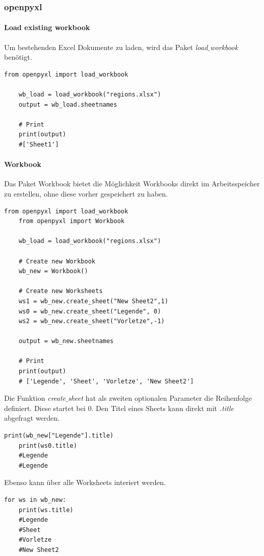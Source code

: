 \subsubsection{openpyxl}

\paragraph{Load existing workbook}
Um bestehenden Excel Dokumente zu laden, wird das Paket \textit{load}$\_$\textit{workbook} benötigt.
\begin{lstlisting}[style=python]
	from openpyxl import load_workbook
	
	wb_load = load_workbook("regions.xlsx")
	output = wb_load.sheetnames
	
	# Print
	print(output)
	#['Sheet1']
\end{lstlisting}

\paragraph{Workbook}
Das Paket Workbook bietet die Möglichkeit Workbooks direkt im Arbeitsspeicher zu erstellen, ohne diese vorher gespeichert zu haben.
\begin{lstlisting}[style=python]
	from openpyxl import load_workbook
	from openpyxl import Workbook
	
	wb_load = load_workbook("regions.xlsx")
	
	# Create new Workbook
	wb_new = Workbook()
	
	# Create new Worksheets
	ws1 = wb_new.create_sheet("New Sheet2",1)
	ws0 = wb_new.create_sheet("Legende", 0)
	ws2 = wb_new.create_sheet("Vorletze",-1)
	
	output = wb_new.sheetnames
	
	# Print
	print(output)
	# ['Legende', 'Sheet', 'Vorletze', 'New Sheet2']
\end{lstlisting}
Die Funktion \textit{create}$\_$\textit{sheet} hat als zweiten optionalen Parameter die Reihenfolge definiert. Diese startet bei 0.
Den Titel eines Sheets kann direkt mit \textit{.title} abgefragt werden.

\begin{lstlisting}[style=python]
	print(wb_new["Legende"].title)
	print(ws0.title) 
	#Legende
	#Legende
\end{lstlisting}

Ebenso kann über alle Worksheets interiert werden.
\begin{lstlisting}[style=python]
	for ws in wb_new:
	print(ws.title)
	#Legende
	#Sheet
	#Vorletze
	#New Sheet2
\end{lstlisting}

